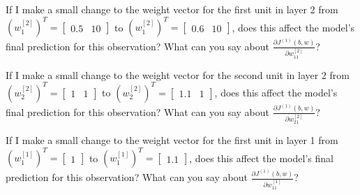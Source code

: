\documentclass[]{extarticle}
\begin{document}
\vspace{3cm}

If I make a small change to the weight vector for the first unit in
layer 2 from
\(\left(w^{[2]}_1\right)^T = \begin{bmatrix}0.5 & 10 \end{bmatrix}\) to
\(\left(w^{[2]}_1\right)^T = \begin{bmatrix}0.6 & 10 \end{bmatrix}\),
does this affect the model's final prediction for this observation? What
can you say about
\(\frac{\partial J^{(1)}(b, w)}{\partial w^{[2]}_{11}}\)?

\vspace{3cm}

If I make a small change to the weight vector for the second unit in
layer 2 from
\(\left(w^{[2]}_2\right)^T = \begin{bmatrix}1 & 1 \end{bmatrix}\) to
\(\left(w^{[2]}_2\right)^T = \begin{bmatrix}1.1 & 1\end{bmatrix}\), does
this affect the model's final prediction for this observation? What can
you say about \(\frac{\partial J^{(1)}(b, w)}{\partial w^{[2]}_{21}}\)?

\vspace{3cm}

If I make a small change to the weight vector for the first unit in
layer 1 from
\(\left(w^{[1]}_1\right)^T = \begin{bmatrix}1\end{bmatrix}\) to
\(\left(w^{[1]}_1\right)^T = \begin{bmatrix}1.1\end{bmatrix}\), does
this affect the model's final prediction for this observation? What can
you say about \(\frac{\partial J^{(1)}(b, w)}{\partial w^{[1]}_{11}}\)?
\end{document}
